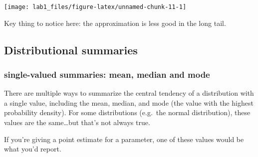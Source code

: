 \documentclass[]{article}
\newenvironment{Shaded}{\begin{snugshade}}{\end{snugshade}}
\newcommand{\KeywordTok}[1]{\textcolor[rgb]{0.13,0.29,0.53}{\textbf{#1}}}
\newcommand{\DataTypeTok}[1]{\textcolor[rgb]{0.13,0.29,0.53}{#1}}
\newcommand{\DecValTok}[1]{\textcolor[rgb]{0.00,0.00,0.81}{#1}}
\newcommand{\FloatTok}[1]{\textcolor[rgb]{0.00,0.00,0.81}{#1}}
\newcommand{\StringTok}[1]{\textcolor[rgb]{0.31,0.60,0.02}{#1}}
\newcommand{\CommentTok}[1]{\textcolor[rgb]{0.56,0.35,0.01}{\textit{#1}}}
\newcommand{\OperatorTok}[1]{\textcolor[rgb]{0.81,0.36,0.00}{\textbf{#1}}}
\newcommand{\NormalTok}[1]{#1}
\begin{document}
\begin{Shaded}
\end{Shaded}

\begin{center}\texttt{[image: lab1\_files/figure-latex/unnamed-chunk-11-1]} \end{center}

Key thing to notice here: the approximation is less good in the long
tail.

\subsection{Distributional summaries}\label{distributional-summaries}

\subsubsection{single-valued summaries: mean, median and
mode}\label{single-valued-summaries-mean-median-and-mode}

There are multiple ways to summarize the central tendency of a
distribution with a single value, including the mean, median, and mode
(the value with the highest probability density). For some distributions
(e.g.~the normal distribution), these values are the same\ldots{}but
that's not always true.

If you're giving a point estimate for a parameter, one of these values
would be what you'd report.
\end{document}
